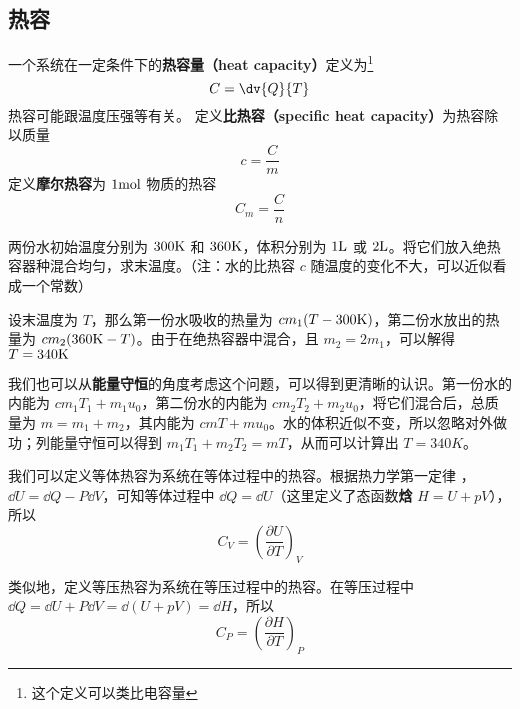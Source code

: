 
\begin{issues}
\issueTODO
\end{issues}
\subsection{热容}
一个系统在一定条件下的\textbf{热容量（heat capacity）}定义为\footnote{这个定义可以类比电容量}
\begin{equation}
C = \dv{Q}{T}
\end{equation}
热容可能跟温度压强等有关。 定义\textbf{比热容（specific heat capacity）}为热容除以质量
\begin{equation}
c = \frac{C}{m}
\end{equation}
定义\textbf{摩尔热容}为 $1 \rm{mol}$ 物质的热容
\begin{equation}
C_m=\frac{C}{n}
\end{equation}

\begin{example}{}
两份水初始温度分别为 $300\rm{K}$ 和 $360\rm{K}$，体积分别为 $1\rm{L}$ 或 $2 \rm{L}$。将它们放入绝热容器种混合均匀，求末温度。（注：水的比热容 $c$ 随温度的变化不大，可以近似看成一个常数）

设末温度为 $T$，那么第一份水吸收的热量为 $c m_1(T-300\rm{K})$，第二份水放出的热量为 $cm_2(360{\rm{K}}-T)$。由于在绝热容器中混合，且 $m_2=2m_1$，可以解得 $T=340\rm{K}$

我们也可以从\textbf{能量守恒}的角度考虑这个问题，可以得到更清晰的认识。第一份水的内能为 $cm_1T_1+m_1u_0$，第二份水的内能为 $cm_2T_2+m_2u_0$，将它们混合后，总质量为 $m=m_1+m_2$，其内能为 $cmT+mu_0$。水的体积近似不变，所以忽略对外做功；列能量守恒可以得到 $m_1T_1+m_2T_2=mT$，从而可以计算出 $T=340K$。
\end{example}

我们可以定义等体热容为系统在等体过程中的热容。根据热力学第一定律 ，$\dd U=\dd Q-P\dd V$，可知等体过程中 $\dd Q=\dd U$（这里定义了态函数\textbf{焓} $H=U+pV$），所以
\begin{equation}\label{ThCapa_eq1}
C_V=\left(\frac{\partial U}{\partial T}\right)_V
\end{equation}

类似地，定义等压热容为系统在等压过程中的热容。在等压过程中 $\dd Q=\dd U+P\dd V=\dd (U+pV)=\dd H$，所以
\begin{equation}\label{ThCapa_eq2}
C_P=\left(\frac{\partial H}{\partial T}\right)_P
\end{equation}

